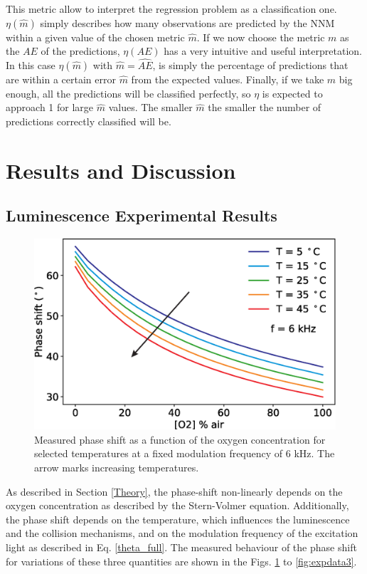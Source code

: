 \documentclass[9pt,twocolumn,twoside,pdftex]{optica}
\begin{document}
This metric allow to interpret the regression problem as a classification one. $\eta(\hat m)$ simply describes how many observations are predicted by the NNM within a given value of the chosen metric $\hat m$. If we now choose the metric $m$ as the $AE$ of the predictions, $\eta(AE)$ has a very intuitive and useful interpretation. 
In this case $\eta(\hat{m})$ with $\hat m = \hat{AE}$, is simply the percentage of predictions that are within a certain error $\hat m$ from the expected values. Finally, if we take $\hat m$ big enough, all the predictions will be classified perfectly, so $\eta$ is expected to approach 1 for large $\hat m$ values. The smaller $\hat m$ the smaller the number of predictions correctly classified will be.


\section{Results and Discussion}
\label{Results}

\subsection{Luminescence Experimental Results}

\begin{figure}[b!]
\centering
\includegraphics[width=8.2 cm]{phase_O2_T.eps}
\caption{Measured phase shift as a function of the oxygen concentration for selected temperatures at a fixed modulation frequency of 6 kHz. The arrow marks increasing temperatures.}
\label{fig:expdata1}
\end{figure}

As described in Section \ref{Theory}, the phase-shift non-linearly depends on the oxygen concentration as described by the Stern-Volmer equation. Additionally, the phase shift depends on the temperature, which influences the luminescence and the collision mechanisms, and on the modulation frequency of the excitation light as described in Eq. \ref{theta_full}. The measured behaviour of the phase shift for variations of these three quantities are shown in the Figs. \ref{fig:expdata1} to \ref{fig:expdata3}.
\end{document}
